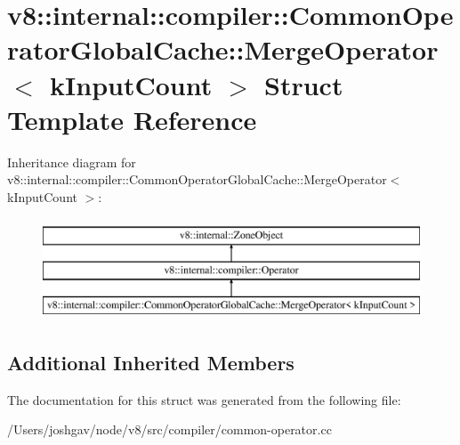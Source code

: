 \hypertarget{structv8_1_1internal_1_1compiler_1_1_common_operator_global_cache_1_1_merge_operator}{}\section{v8\+:\+:internal\+:\+:compiler\+:\+:Common\+Operator\+Global\+Cache\+:\+:Merge\+Operator$<$ k\+Input\+Count $>$ Struct Template Reference}
\label{structv8_1_1internal_1_1compiler_1_1_common_operator_global_cache_1_1_merge_operator}
Inheritance diagram for v8\+:\+:internal\+:\+:compiler\+:\+:Common\+Operator\+Global\+Cache\+:\+:Merge\+Operator$<$ k\+Input\+Count $>$\+:\begin{figure}[H]
\begin{center}
\leavevmode
\includegraphics[height=3.000000cm]{structv8_1_1internal_1_1compiler_1_1_common_operator_global_cache_1_1_merge_operator}
\end{center}
\end{figure}
\subsection*{Additional Inherited Members}


The documentation for this struct was generated from the following file\+:\begin{DoxyCompactItemize}
\item 
/\+Users/joshgav/node/v8/src/compiler/common-\/operator.\+cc\end{DoxyCompactItemize}
